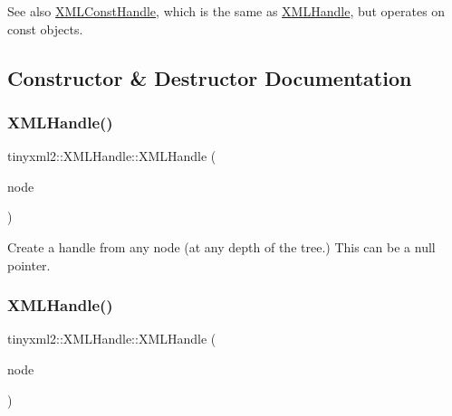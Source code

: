 See also \hyperlink{classtinyxml2_1_1_x_m_l_const_handle}{X\+M\+L\+Const\+Handle}, which is the same as \hyperlink{classtinyxml2_1_1_x_m_l_handle}{X\+M\+L\+Handle}, but operates on const objects. 

\subsection{Constructor \& Destructor Documentation}
\mbox{\label{classtinyxml2_1_1_x_m_l_handle_a9c240a35c18f053509b4b97ddccd9793}} 
\subsubsection{\texorpdfstring{X\+M\+L\+Handle()}{XMLHandle()}\hspace{0.1cm}{\footnotesize\ttfamily [1/3]}}
{\footnotesize\ttfamily tinyxml2\+::\+X\+M\+L\+Handle\+::\+X\+M\+L\+Handle (\begin{DoxyParamCaption}\item[{\hyperlink{classtinyxml2_1_1_x_m_l_node}{X\+M\+L\+Node} $\ast$}]{node }\end{DoxyParamCaption})\hspace{0.3cm}{\ttfamily [inline]}}



Create a handle from any node (at any depth of the tree.) This can be a null pointer. 

\mbox{\label{classtinyxml2_1_1_x_m_l_handle_aa2edbc1c0d3e3e8259bd98de7f1cf500}} 
\subsubsection{\texorpdfstring{X\+M\+L\+Handle()}{XMLHandle()}\hspace{0.1cm}{\footnotesize\ttfamily [2/3]}}
{\footnotesize\ttfamily tinyxml2\+::\+X\+M\+L\+Handle\+::\+X\+M\+L\+Handle (\begin{DoxyParamCaption}\item[{\hyperlink{classtinyxml2_1_1_x_m_l_node}{X\+M\+L\+Node} \&}]{node }\end{DoxyParamCaption})\hspace{0.3cm}{\ttfamily [inline]}}



